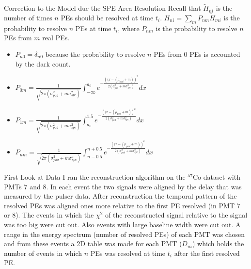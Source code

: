 \documentclass{beamer}
\begin{document}
\begin{frame}{Correction to the Model due the SPE Area Resolution}
Recall that $\tilde{H}_{ni}$ is the number of times $n$ PEs should be resolved at time $t_i$.
$H_{ni}=\sum_mP_{nm}\tilde{H}_{mi}$ is the probability to resolve $n$ PEs at time $t_i$, where $P_{nm}$ is the probability to resolve $n$ PEs from $m$ real PEs.\\
\begin{itemize}
\item $P_{n0}=\delta_{n0}$ because the probability to resolve $n$ PEs from 0 PEs is accounted by the dark count.
\item $P_{0m}=\frac{1}{\sqrt{2\pi\left(\sigma_{pad}^2+m\sigma_{spe}^2\right)}}\int_{-\infty}^{a_0}e^{-\frac{\left((x-(\mu_{pad}+m)\right)^2}{2\left(\sigma_{pad}^2+m\sigma_{spe}^2\right)}}dx$\\
\item $P_{1m}=\frac{1}{\sqrt{2\pi\left(\sigma_{pad}^2+m\sigma_{spe}^2\right)}}\int_{a_0}^{1.5}e^{-\frac{\left((x-(\mu_{pad}+m)\right)^2}{2\left(\sigma_{pad}^2+m\sigma_{spe}^2\right)}}dx$\\
\item $P_{nm}=\frac{1}{\sqrt{2\pi\left(\sigma_{pad}^2+m\sigma_{spe}^2\right)}}\int_{n-0.5}^{n+0.5}e^{-\frac{\left((x-(\mu_{pad}+m)\right)^2}{2\left(\sigma_{pad}^2+m\sigma_{spe}^2\right)}}dx$\\
\end{itemize}
\end{frame}

\begin{frame}{First Look at Data}
I ran the reconstruction algorithm on the $^{57}$Co dataset with PMTs 7 and 8. In each event the two signals were aligned by the delay that was measured by the pulser data. After reconstruction the temporal pattern of the resolved PEs was aligned ones more relative to the first PE resolved (in PMT 7 or 8). The events in which the $\chi^2$ of the reconstructed signal relative to the signal was too big were cut out. Also events with large baseline width were cut out. A range in the energy spectrum (number of resolved PEs) of each PMT was chosen and from these events a 2D table was made for each PMT ($D_{ni}$) which holds the number of events in which $n$ PEs was resolved at time $t_i$ after the first resolved PE.
\end{frame}
\end{document}
